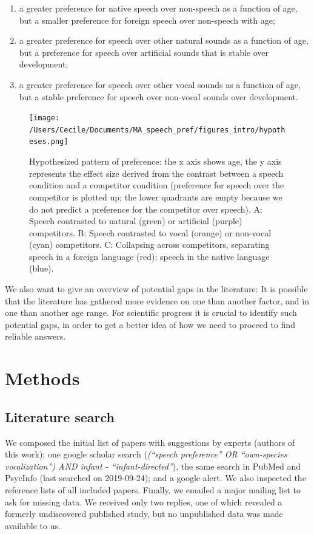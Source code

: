 \documentclass[man]{apa6}
\providecommand{\tightlist}{%
  \setlength{\itemsep}{0pt}\setlength{\parskip}{0pt}}
\begin{document}
\begin{enumerate}
\def\labelenumi{\arabic{enumi}.}
\tightlist
\item
  a greater preference for native speech over non-speech as a function
  of age, but a smaller preference for foreign speech over non-speech
  with age;
\item
  a greater preference for speech over other natural sounds as a
  function of age, but a preference for speech over artificial sounds
  that is stable over development;
\item
  a greater preference for speech over other vocal sounds as a function
  of age, but a stable preference for speech over non-vocal sounds over
  development.
\end{enumerate}

\begin{figure}
\centering
\texttt{[image: /Users/Cecile/Documents/MA\_speech\_pref/figures\_intro/hypotheses.png]}
\caption{\label{fig:hyp}Hypothesized pattern of preference: the x axis shows
age, the y axis represents the effect size derived from the contrast
between a speech condition and a competitor condition (preference for
speech over the competitor is plotted up; the lower quadrants are empty
because we do not predict a preference for the competitor over speech).
A: Speech contrasted to natural (green) or artificial (purple)
competitors. B: Speech contrasted to vocal (orange) or non-vocal (cyan)
competitors. C: Collapsing across competitors, separating speech in a
foreign language (red); speech in the native language (blue).}
\end{figure}

We also want to give an overview of potential gaps in the literature: It
is possible that the literature has gathered more evidence on one than
another factor, and in one than another age range. For scientific
progress it is crucial to identify such potential gaps, in order to get
a better idea of how we need to proceed to find reliable answers.

\section{Methods}\label{methods}

\subsection{Literature search}\label{literature-search}

We composed the initial list of papers with suggestions by experts
(authors of this work); one google scholar search
(\emph{(\enquote{speech preference} OR \enquote{own-species
vocalization}) AND infant - \enquote{infant-directed}}), the same search
in PubMed and PsycInfo (last searched on 2019-09-24); and a google
alert. We also inspected the reference lists of all included papers.
Finally, we emailed a major mailing list to ask for missing data. We
received only two replies, one of which revealed a formerly undiscovered
published study, but no unpublished data was made available to us.
\end{document}
